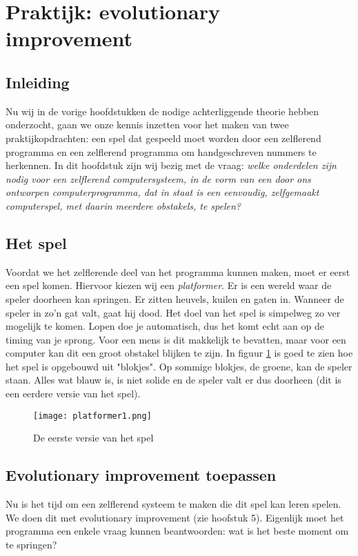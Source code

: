 \section{Praktijk: evolutionary improvement}

\subsection{Inleiding}
Nu wij in de vorige hoofdstukken de nodige achterliggende theorie hebben onderzocht, gaan we onze kennis inzetten voor het maken van twee praktijkopdrachten: een spel dat gespeeld moet worden door een zelflerend programma en een zelflerend programma om handgeschreven nummers te herkennen. In dit hoofdstuk zijn wij bezig met de vraag: \textit{welke onderdelen zijn nodig voor een zelflerend computersysteem, in de vorm van een door ons ontworpen computerprogramma, dat in staat is een eenvoudig, zelfgemaakt computerspel, met daarin meerdere obstakels, te spelen?}

\subsection{Het spel}
Voordat we het zelflerende deel van het programma kunnen maken, moet er eerst een spel komen. Hiervoor kiezen wij een \textit{platformer}. Er is een wereld waar de speler doorheen kan springen. Er zitten heuvels, kuilen en gaten in. Wanneer de speler in zo'n gat valt, gaat hij dood. Het doel van het spel is simpelweg zo ver mogelijk te komen. Lopen doe je automatisch, dus het komt echt aan op de timing van je sprong. Voor een mens is dit makkelijk te bevatten, maar voor een computer kan dit een groot obstakel blijken te zijn.
In figuur \ref{fig:platformer1} is goed te zien hoe het spel is opgebouwd uit "blokjes". Op sommige blokjes, de groene, kan de speler staan. Alles wat blauw is, is niet solide en de speler valt er dus doorheen (dit is een eerdere versie van het spel).

\begin{figure}[H]
  \centering
    \texttt{[image: platformer1.png]}
  \caption{De eerste versie van het spel}
  \label{fig:platformer1}
\end{figure}

\subsection{Evolutionary improvement toepassen}
Nu is het tijd om een zelflerend systeem te maken die dit spel kan leren spelen. We doen dit met evolutionary improvement (zie hoofstuk 5). Eigenlijk moet het programma een enkele vraag kunnen beantwoorden: wat is het beste moment om te springen?

